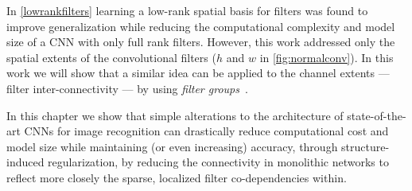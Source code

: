 \documentclass[thesis]{subfiles}
\begin{document}
	In \cref{lowrankfilters} learning a low-rank spatial basis for filters was found to improve generalization while reducing the computational complexity and model size of a CNN with only full rank filters. However, this work addressed only the spatial extents of the convolutional filters (\ie $h$ and $w$ in \cref{fig:normalconv}). In this work we will show that a similar idea can be applied to the channel extents --- \ie filter inter-connectivity --- by using \emph{filter groups}~\citep{Krizhevsky2012}. 
	
	
	
	
	In this chapter we show that simple alterations to the architecture of state-of-the-art CNNs for image recognition can drastically reduce computational cost and model size while maintaining (or even increasing) accuracy, through structure-induced regularization, by reducing the connectivity in monolithic networks to reflect more closely the sparse, localized filter co-dependencies within.
	
\end{document}
